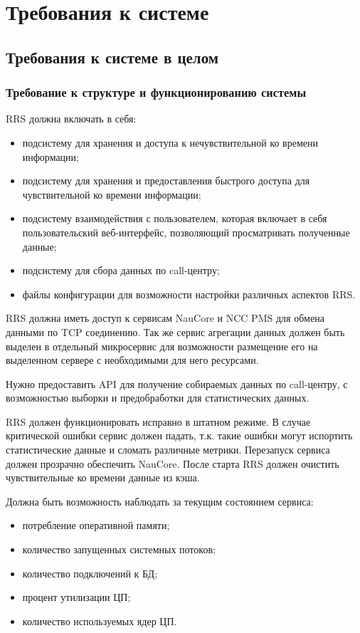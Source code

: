\section{Требования к системе}

\subsection{Требования к системе в целом}

\subsubsection{Требование к структуре и функционированию системы} %

RRS должна включать в себя:
\begin{itemize}
    \item подсистему для хранения и доступа к нечувствительной ко времени информации;
    \item подсистему для хранения и предоставления быстрого доступа для чувствительной ко времени информации;
    \item подсистему взаимодействия с пользователем, которая включает в себя пользовательский веб-интерфейс, позволяющий просматривать полученные данные;
    \item подсистему для сбора данных по call-центру;
    \item файлы конфигурации для возможности настройки различных аспектов RRS\@.
\end{itemize}

RRS должна иметь доступ к сервисам NauCore и NCC PMS для обмена данными по TCP соединению.
Так же сервис агрегации данных должен быть выделен в отдельный микросервис для возможности размещение его на выделенном сервере с необходимыми для него ресурсами.

Нужно предоставить API для получение собираемых данных по call-центру,
с возможностью выборки и предобработки для статистических данных.

RRS должен функционировать исправно в штатном режиме.
В случае критической ошибки сервис должен падать,
т.к. такие ошибки могут испортить статистические данные и сломать различные метрики.
Перезапуск сервиса должен прозрачно обеспечить NauCore.
После старта RRS должен очистить чувствительные ко времени данные из кэша.

Должна быть возможность наблюдать за текущим состоянием сервиса:
\begin{itemize}
    \item потребление оперативной памяти;
    \item количество запущенных системных потоков;
    \item количество подключений к БД;
    \item процент утилизации ЦП;
    \item количество используемых ядер ЦП.
\end{itemize}

